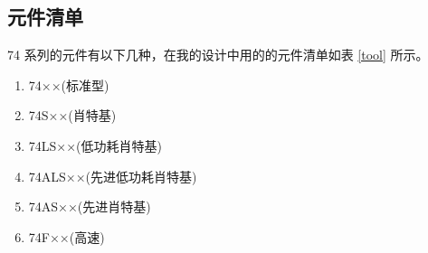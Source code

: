 \subsection{元件清单}

74 系列的元件有以下几种，在我的设计中用的的元件清单如表 \ref{tool} 所示。

\begin{enumerate}[1)]
	\item 74××(标准型)
	\item 74S××(肖特基)
	\item 74LS××(低功耗肖特基)
	\item 74ALS××(先进低功耗肖特基)
	\item 74AS××(先进肖特基)
	\item 74F××(高速)
\end{enumerate}


